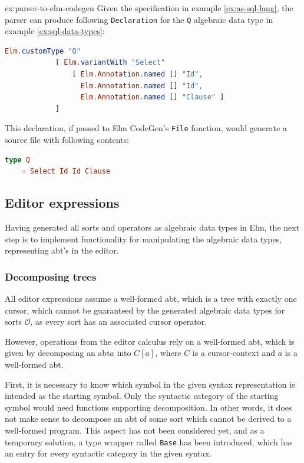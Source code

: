\documentclass[sigplan,review]{acmart}
\newcommand{\abt}{\textsf{abt}\xspace}
\begin{document}
\begin{example}{ex:parser-to-elm-codegen}
  Given the specification in example \cref{ex:as-sql-lang}, the parser can produce following \texttt{Declaration} for the \texttt{Q} algebraic data type in example \cref{ex:sql-data-types}:
  \begin{lstlisting}[language=elm]
Elm.customType "Q"
            [ Elm.variantWith "Select" 
                [ Elm.Annotation.named [] "Id", 
                  Elm.Annotation.named [] "Id", 
                  Elm.Annotation.named [] "Clause" ]
            ]
\end{lstlisting}

  This declaration, if passed to Elm CodeGen's \texttt{File} function, would generate a source file with following contents:
  \begin{lstlisting}[language=elm]
type Q
    = Select Id Id Clause
\end{lstlisting}
\end{example}

\subsection{Editor expressions}

Having generated all sorts and operators as algebraic data types in Elm,
the next step is to implement functionality for manipulating the algebraic
data types, representing {\abt}'s in the editor.

\subsubsection{Decomposing trees}

All editor expressions assume a well-formed \abt, which is a tree
with exactly one cursor, which cannot be guaranteed by the generated
algebraic data types for sorts $\mathcal{O}$, as every sort has an associated cursor operator.

However, operations from the editor calculus rely on a well-formed \abt, which is given
by decomposing an \abt $a$ into $C[\dot{a}]$, where $C$ is a
cursor-context and $\dot{a}$ is a
well-formed \abt.

First, it is necessary to know which symbol in the given syntax representation
is intended as the starting symbol. Only the syntactic category of the starting symbol
would need functions supporting decomposition.
In other words, it does not make sense to decompose an \abt of some sort which
cannot be derived to a well-formed program.
This aspect has not been considered yet, and as a temporary solution,
a type wrapper called \texttt{Base} has been introduced, which has an entry for
every syntactic category in the given syntax.
\end{document}
